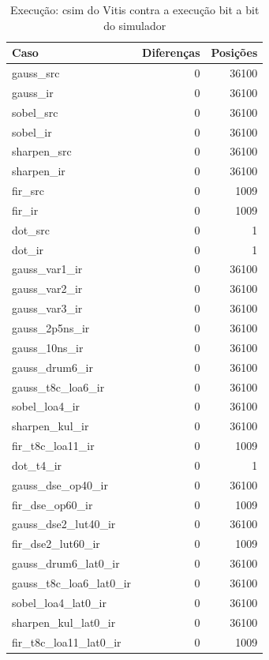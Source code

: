\begin{table}[htbp]
\centering
\caption{Execução: csim do Vitis contra a execução bit a bit do simulador}
\begin{tabular}{|l|r|r|}
\hline
\rowcolor{tabAzul}\color{white}Caso & \color{white}Diferenças & \color{white}Posições \\
\hline
gauss\_src & 0 & 36100 \\ \hline
gauss\_ir & 0 & 36100 \\ \hline
sobel\_src & 0 & 36100 \\ \hline
sobel\_ir & 0 & 36100 \\ \hline
sharpen\_src & 0 & 36100 \\ \hline
sharpen\_ir & 0 & 36100 \\ \hline
fir\_src & 0 & 1009 \\ \hline
fir\_ir & 0 & 1009 \\ \hline
dot\_src & 0 & 1 \\ \hline
dot\_ir & 0 & 1 \\ \hline
gauss\_var1\_ir & 0 & 36100 \\ \hline
gauss\_var2\_ir & 0 & 36100 \\ \hline
gauss\_var3\_ir & 0 & 36100 \\ \hline
gauss\_2p5ns\_ir & 0 & 36100 \\ \hline
gauss\_10ns\_ir & 0 & 36100 \\ \hline
gauss\_drum6\_ir & 0 & 36100 \\ \hline
gauss\_t8c\_loa6\_ir & 0 & 36100 \\ \hline
sobel\_loa4\_ir & 0 & 36100 \\ \hline
sharpen\_kul\_ir & 0 & 36100 \\ \hline
fir\_t8c\_loa11\_ir & 0 & 1009 \\ \hline
dot\_t4\_ir & 0 & 1 \\ \hline
gauss\_dse\_op40\_ir & 0 & 36100 \\ \hline
fir\_dse\_op60\_ir & 0 & 1009 \\ \hline
gauss\_dse2\_lut40\_ir & 0 & 36100 \\ \hline
fir\_dse2\_lut60\_ir & 0 & 1009 \\ \hline
gauss\_drum6\_lat0\_ir & 0 & 36100 \\ \hline
gauss\_t8c\_loa6\_lat0\_ir & 0 & 36100 \\ \hline
sobel\_loa4\_lat0\_ir & 0 & 36100 \\ \hline
sharpen\_kul\_lat0\_ir & 0 & 36100 \\ \hline
fir\_t8c\_loa11\_lat0\_ir & 0 & 1009 \\ \hline

\end{tabular}
\end{table}
